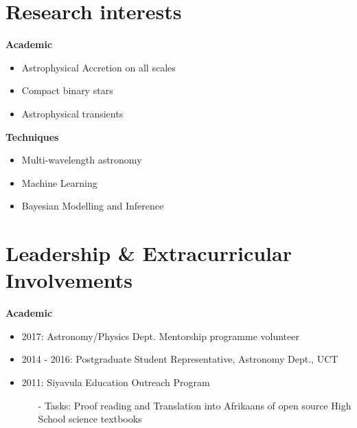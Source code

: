\documentclass{article}
\begin{document}
\section*{Research interests}
\large\textbf{Academic}
\normalsize
  \begin{itemize}
    \item Astrophysical Accretion on all scales
    \item Compact binary stars
    \item Astrophysical transients
  \end{itemize}
\large\textbf{Techniques}
\normalsize
  \begin{itemize}
    \item Multi-wavelength astronomy
    \item Machine Learning
    \item Bayesian Modelling and Inference
  \end{itemize}



\section*{Leadership \& Extracurricular Involvements}
\large\textbf{Academic}
\vspace{0.2cm}
\normalsize
\begin{itemize}
 \item 2017: Astronomy/Physics Dept. Mentorship programme volunteer
 \item 2014 - 2016: Postgraduate Student Representative, Astronomy Dept., UCT
 \item 2011: Siyavula Education Outreach Program
 \begin{itemize}
  \item[-] Tasks: Proof reading and Translation into Afrikaans of open source High School science textbooks
  \end{itemize}
\end{itemize} 
\vspace{0.2cm}
\end{document}
